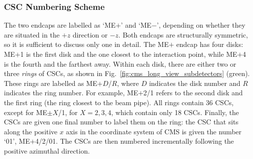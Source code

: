 





\subsubsection{CSC Numbering Scheme}
\label{sec:csc_numbering}
The two endcaps are labelled as `ME$+$' and `ME$-$', depending on whether they are situated in the $+z$ direction or $-z$.
Both endcaps are structurally symmetric, so it is sufficient to discuss only one in detail.
The ME$+$ endcap has four disks: ME$+$1 is the first disk and the one closest to the interaction point, while ME$+$4 is the fourth and the farthest away. 
Within each disk, there are either two or three \emph{rings} of CSCs, as shown in Fig.~\ref{fig:cms_long_view_subdetectors} (green).
These rings are labelled as ME$+D$/$R$, where $D$ indicates the disk number and $R$ indicates the ring number.
For example, ME$+$2/1 refers to the second disk and the first ring (the ring closest to the beam pipe).
All rings contain 36 CSCs, except for ME$\pm X$/1, for $X= 2,3,4$, which contain only 18 CSCs.
Finally, the CSCs are given one final number to label them on the ring:
the CSC that sits along the positive $x$ axis in the coordinate system of CMS is given the number `01', \eg ME$+$4/2/01. 
The CSCs are then numbered incrementally following the positive azimuthal direction.

